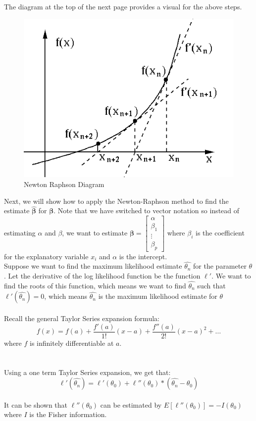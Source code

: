 \documentclass{article}
\begin{document}
\noindent The diagram at the top of the next page provides a visual for the above steps.\\

\begin{figure}[hbtp]
        \centering
        \includegraphics[width=4.5in]{NewtonRaphson.png}
        \caption{Newton Raphson Diagram}
        \label{Newton Raphson}
    \end{figure}

\noindent Next, we will show how to apply the Newton-Raphson method to find the estimate  $\boldsymbol{\hat{\beta}}$ for $\boldsymbol{\beta}$. Note that we have switched to vector notation so instead of estimating $\alpha$ and $\beta$, we want to estimate $\boldsymbol{\beta} = 
\begin{bmatrix} 
    \alpha \\
    \beta_1 \\
    \vdots \\
    \beta_p
\end{bmatrix}$ where $\beta_i$ is the coefficient for the explanatory variable $x_i$ and $\alpha$ is the intercept. \\



\noindent Suppose we want to find the maximum likelihood estimate $\hat{\theta_n}$ for the parameter $\theta$. Let the derivative of the log likelihood function be the function $\ell'$. We want to find the roots of this function, which means we want to find $\hat{\theta_n}$ such that $\ell'(\hat{\theta_n}) = 0$, which means $\hat{\theta_n}$ is the maximum likelihood estimate for $\theta$
\\\\
Recall the general Taylor Series expansion formula:
$$
f(x) = f(a) + \dfrac{f'(a)}{1!}(x - a) + \dfrac{f''(a)}{2!}(x-a)^2 + \ldots
$$
where $f$ is infinitely differentiable at $a$.
\\\\\\
Using a one term Taylor Series expansion, we get that:
$$
\ell'(\hat{\theta_n}) = \ell'(\theta_0) + \ell''(\theta_0)*(\hat{\theta_n} - \theta_0)
$$
\\
It can be shown that $\ell''(\theta_0)$ can be estimated by $E[\ell''(\theta_0)] = -I(\theta_0)$ where $I$ is the Fisher information. \\\\
\end{document}
